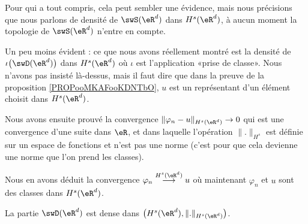 \begin{remark}
    Pour qui a tout compris, cela peut sembler une évidence, mais nous précisions que nous parlons de densité de \( \swS(\eR^d)\) dans \( H^s(\eR^d)\), à aucun moment la topologie de \( \swS(\eR^d)\) n'entre en compte.

    Un peu moins évident : ce que nous avons réellement montré est la densité de \( \iota\big( \swD(\eR^d) \big)\) dans \( H^s(\eR^d)\) où \( \iota\) est l'application «prise de classe». Nous n'avons pas insisté là-dessus, mais il faut dire que dans la preuve de la proposition \ref{PROPooMKAFooKDNTbO}, \( u\) est un représentant d'un élément choisit dans \( H^s(\eR^d)\). 
    
    Nous avons ensuite prouvé la convergence \( \| \varphi_n-u \|_{H^s(\eR^d)}\to 0\) qui est une convergence d'une suite dans \( \eR\), et dans laquelle l'opération \( \| . \|_{H^s}\) est définie sur un espace de fonctions et n'est pas une norme (c'est pour que cela devienne une norme que l'on prend les classes).
    
    Nous en avons déduit la convergence \( \varphi_n\stackrel{H^s(\eR^d)}{\longrightarrow}u\) où maintenant \( \varphi_n\) et \( u\) sont des classes dans \( H^s(\eR^d)\).
\end{remark}

\begin{proposition}     \label{PROPooLIQJooKpWtnV}
    La partie \( \swD(\eR^d)\) est dense dans \( \big( H^s(\eR^d),\| . \|_{H^s(\eR^d)} \big)\).
\end{proposition}

